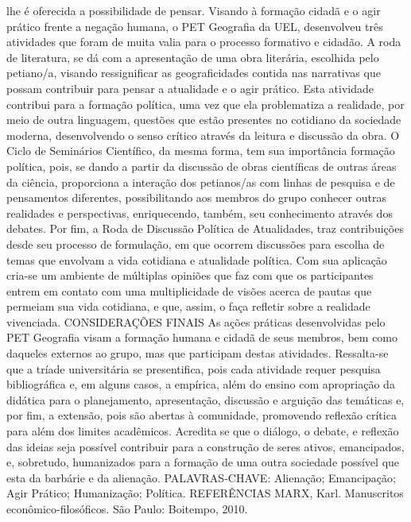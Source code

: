 lhe é oferecida a possibilidade de pensar. Visando à formação cidadã e o agir prático frente a 
negação humana, o PET Geografia da UEL, desenvolveu três atividades que foram de muita valia 
para o processo formativo e cidadão. 
A roda de literatura, se dá com a apresentação de uma obra literária, escolhida pelo 
petiano/a, visando ressignificar as geograficidades contida nas narrativas que possam contribuir 
para pensar a atualidade e o agir prático. Esta atividade contribui para a formação política, uma 
vez que ela problematiza a realidade, por meio de outra linguagem, questões que estão presentes 
no cotidiano da sociedade moderna, desenvolvendo o senso crítico através da leitura e discussão
da obra.
O Ciclo de Seminários Científico, da mesma forma, tem sua importância formação política, 
pois, se dando a partir da discussão de obras científicas de outras áreas da ciência, proporciona a
interação dos petianos/as com linhas de pesquisa e de pensamentos diferentes, possibilitando aos 
membros do grupo conhecer outras realidades e perspectivas, enriquecendo, também, seu
conhecimento através dos debates.
Por fim, a Roda de Discussão Política de Atualidades, traz contribuições desde seu 
processo de formulação, em que ocorrem discussões para escolha de temas que envolvam a vida 
cotidiana e atualidade política. Com sua aplicação cria-se um ambiente de múltiplas opiniões que
faz com que os participantes entrem em contato com uma multiplicidade de visões acerca de pautas
que permeiam sua vida cotidiana, e que, assim, o faça refletir sobre a realidade vivenciada.
CONSIDERAÇÕES FINAIS
As ações práticas desenvolvidas pelo PET Geografia visam a formação humana e cidadã 
de seus membros, bem como daqueles externos ao grupo, mas que participam destas atividades. 
Ressalta-se que a tríade universitária se presentifica, pois cada atividade requer pesquisa 
bibliográfica e, em alguns casos, a empírica, além do ensino com apropriação da didática para o 
planejamento, apresentação, discussão e arguição das temáticas e, por fim, a extensão, pois são 
abertas à comunidade, promovendo reflexão crítica para além dos limites acadêmicos. Acreditase que o diálogo, o debate, e reflexão das ideias seja possível contribuir para a construção de seres 
ativos, emancipados, e, sobretudo, humanizados para a formação de uma outra sociedade possível
que esta da barbárie e da alienação.
PALAVRAS-CHAVE: Alienação; Emancipação; Agir Prático; Humanização; Política.
REFERÊNCIAS
MARX, Karl. Manuscritos econômico-filosóficos. São Paulo: Boitempo, 2010.

